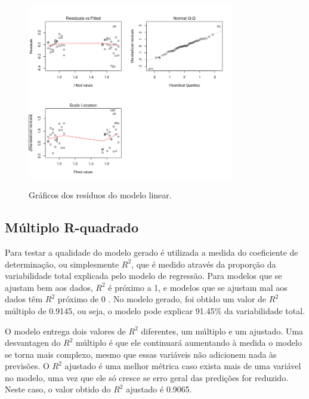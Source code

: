 \begin{figure}[H]
    \centering
    \caption{Gráficos dos resíduos do modelo linear.}
    \includegraphics[width=0.8\textwidth]{images/model1ordem.png}
    \label{fig:residuos-plot}
  \end{figure}

\subsection{Múltiplo R-quadrado}

Para testar a qualidade do modelo gerado é utilizada a medida do coeficiente de determinação, ou simplesmente $R^2$, que é medido através da proporção da variabilidade total explicada pelo modelo de regressão. Para modelos que se ajustam bem aos dados, $R^2$ é próximo a 1, e modelos que se ajustam mal aos dados têm $R^2$ próximo de 0 \cite{schneider2010linear}. No modelo gerado, foi obtido um valor de $R^2$ múltiplo de 0.9145, ou seja, o modelo pode explicar 91.45\% da variabilidade total.

O modelo entrega dois valores de $R^2$ diferentes, um múltiplo e um ajustado. Uma desvantagen do $R^2$ múltiplo é que ele continuará aumentando à medida o modelo se torna mais complexo, mesmo que essas variáveis ​​não adicionem nada às previsões. O $R^2$ ajustado é uma melhor métrica caso exista mais de uma variável no modelo, uma vez que ele só cresce se erro geral das predições for reduzido. Neste caso, o valor obtido do $R^2$ ajustado é 0.9065. 









